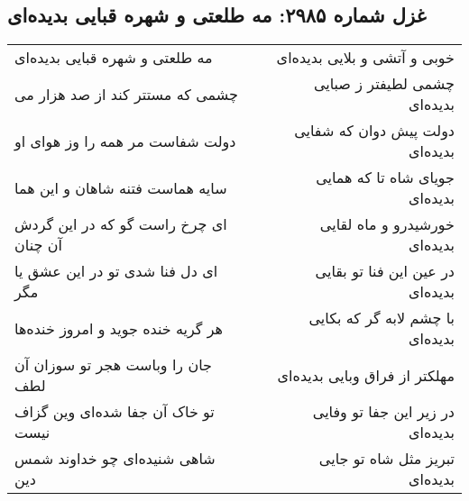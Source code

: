\begin{center}
\section*{غزل شماره ۲۹۸۵: مه طلعتی و شهره قبایی بدیده‌ای}
\label{sec:2985}
\begin{longtable}{l p{0.5cm} r}
مه طلعتی و شهره قبایی بدیده‌ای
&&
خوبی و آتشی و بلایی بدیده‌ای
\\
چشمی که مستتر کند از صد هزار می
&&
چشمی لطیفتر ز صبایی بدیده‌ای
\\
دولت شفاست مر همه را وز هوای او
&&
دولت پیش دوان که شفایی بدیده‌ای
\\
سایه هماست فتنه شاهان و این هما
&&
جویای شاه تا که همایی بدیده‌ای
\\
ای چرخ راست گو که در این گردش آن چنان
&&
خورشیدرو و ماه لقایی بدیده‌ای
\\
ای دل فنا شدی تو در این عشق یا مگر
&&
در عین این فنا تو بقایی بدیده‌ای
\\
هر گریه خنده جوید و امروز خنده‌ها
&&
با چشم لابه گر که بکایی بدیده‌ای
\\
جان را وباست هجر تو سوزان آن لطف
&&
مهلکتر از فراق وبایی بدیده‌ای
\\
تو خاک آن جفا شده‌ای وین گزاف نیست
&&
در زیر این جفا تو وفایی بدیده‌ای
\\
شاهی شنیده‌ای چو خداوند شمس دین
&&
تبریز مثل شاه تو جایی بدیده‌ای
\\
\end{longtable}
\end{center}
